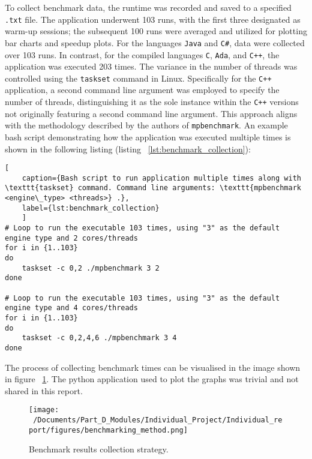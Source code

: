 To collect benchmark data, the runtime was recorded and saved to a specified \texttt{.txt} file. The application underwent 103 runs, with the first three designated as warm-up sessions; the subsequent 100 runs were averaged and utilized for plotting bar charts and speedup plots. For the languages \texttt{Java} and \texttt{C\#}, data were collected over 103 runs. In contrast, for the compiled languages \texttt{C}, \texttt{Ada}, and \texttt{C++}, the application was executed 203 times. The variance in the number of threads was controlled using the \texttt{taskset} command in Linux. Specifically for the \texttt{C++} application, a second command line argument was employed to specify the number of threads, distinguishing it as the sole instance within the \texttt{C++} versions not originally featuring a second command line argument. This approach aligns with the methodology described by the authors of \texttt{mpbenchmark}\cite{mpbenchmark_paper}. An example bash script demonstrating how the application was executed multiple times is shown in the following listing (listing ~\ref{lst:benchmark_collection}):

\begin{lstlisting}[
	caption={Bash script to run application multiple times along with \texttt{taskset} command. Command line arguments: \texttt{mpbenchmark <engine\_type> <threads>} .},
	label={lst:benchmark_collection}
	]
# Loop to run the executable 103 times, using "3" as the default engine type and 2 cores/threads 
for i in {1..103}
do
	taskset -c 0,2 ./mpbenchmark 3 2 
done

# Loop to run the executable 103 times, using "3" as the default engine type and 4 cores/threads 
for i in {1..103}
do
	taskset -c 0,2,4,6 ./mpbenchmark 3 4 
done
\end{lstlisting}

The process of collecting benchmark times can be visualised in the image shown in figure ~\ref{fig:results_collection}. The python application used to plot the graphs was trivial and not shared in this report. 

\begin{figure}[H] %
	\centering
	\texttt{[image: ~/Documents/Part\_D\_Modules/Individual\_Project/Individual\_report/figures/benchmarking\_method.png]} %
	\caption{Benchmark results collection strategy.}
	\label{fig:results_collection} %
\end{figure}


